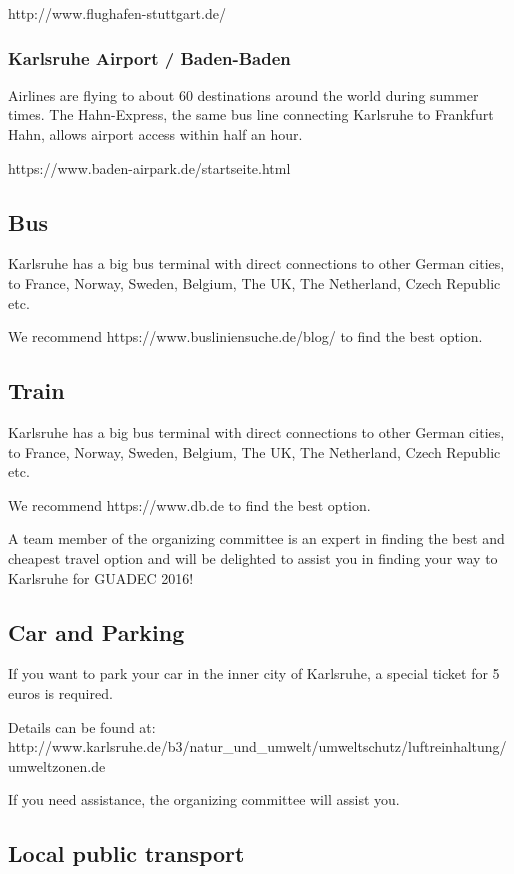 http://www.flughafen-stuttgart.de/

\subsubsection{Karlsruhe Airport / Baden-Baden}

Airlines are flying to about 60 destinations around the world during summer times. The Hahn-Express, the same bus line connecting Karlsruhe to Frankfurt Hahn, allows airport access within half an hour.
 
https://www.baden-airpark.de/startseite.html

\subsection{Bus}

Karlsruhe has a big bus terminal with direct connections to other German cities, to France, Norway, Sweden, Belgium, The UK, The Netherland, Czech Republic etc.

We recommend https://www.busliniensuche.de/blog/ to find the best option.

\subsection{Train}

Karlsruhe has a big bus terminal with direct connections to other German cities, to France, Norway, Sweden, Belgium, The UK, The Netherland, Czech Republic etc.

We recommend https://www.db.de to find the best option.

A team member of the organizing committee is an expert in finding the best and cheapest travel option and will be delighted to assist you in finding your way to Karlsruhe for GUADEC 2016!

\subsection{Car and Parking}

If you want to park your car in the inner city of Karlsruhe, a special ticket for 5 euros is required. 

Details can be found at:
http://www.karlsruhe.de/b3/natur_und_umwelt/umweltschutz/luftreinhaltung/umweltzonen.de

If you need assistance, the organizing committee will assist you.

\subsection{Local public transport}




